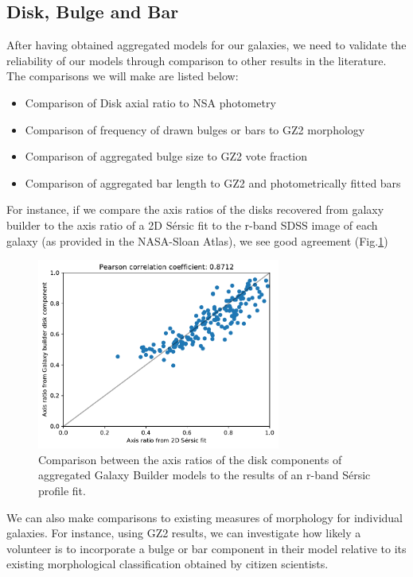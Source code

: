 \documentclass[../main.tex]{subfiles}
\begin{document}
\subsection{Disk, Bulge and Bar}

After having obtained aggregated models for our galaxies, we need to validate the reliability of our models through comparison to other results in the literature. The comparisons we will make are listed below:

\begin{itemize}
    \item Comparison of Disk axial ratio to NSA photometry
    \item Comparison of frequency of drawn bulges or bars to GZ2 morphology
    \item Comparison of aggregated bulge size to GZ2 vote fraction
    \item Comparison of aggregated bar length to GZ2 and photometrically fitted bars
\end{itemize}

For instance, if we compare the axis ratios of the disks recovered from galaxy builder to the axis ratio of a 2D S\'ersic fit to the r-band SDSS image of each galaxy (as provided in the NASA-Sloan Atlas), we see good agreement (Fig.\ref{fig:ax_ratio_comparison})

\begin{figure}
  \includegraphics[width=8cm]{images__results/GZBvsNSA_ax-ratio_SERSIC_BA.pdf}
  \caption{Comparison between the axis ratios of the disk components of aggregated Galaxy Builder models to the results of an r-band S\'ersic profile fit.}
  \label{fig:ax_ratio_comparison}
\end{figure}

We can also make comparisons to existing measures of morphology for individual galaxies. For instance, using GZ2 results, we can investigate how likely a volunteer is to incorporate a bulge or bar component in their model relative to its existing morphological classification obtained by citizen scientists.
\end{document}
